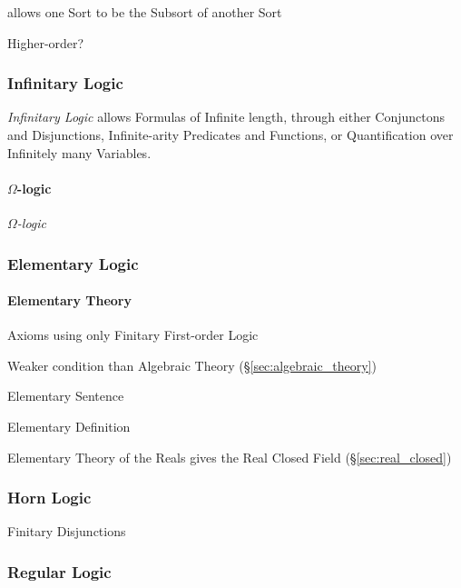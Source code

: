 allows one Sort to be the Subsort of another Sort

Higher-order?



\subsubsection{Infinitary Logic}\label{sec:infinitary_logic}

\emph{Infinitary Logic} allows Formulas of Infinite length, through
either Conjunctons and Disjunctions, Infinite-arity Predicates and
Functions, or Quantification over Infinitely many Variables.



\paragraph{$\Omega$-logic}\label{sec:omega_logic}\hfill

\emph{$\Omega$-logic}



\subsubsection{Elementary Logic}\label{sec:elementary_logic}

\paragraph{Elementary Theory}\label{sec:elementary_theory}\hfill

Axioms using only Finitary First-order Logic %

Weaker condition than Algebraic Theory (\S\ref{sec:algebraic_theory})

Elementary Sentence

Elementary Definition

Elementary Theory of the Reals gives the Real Closed Field
(\S\ref{sec:real_closed})



\subsubsection{Horn Logic}\label{sec:horn_logic}

Finitary Disjunctions



\subsubsection{Regular Logic}\label{sec:regular_logic}

